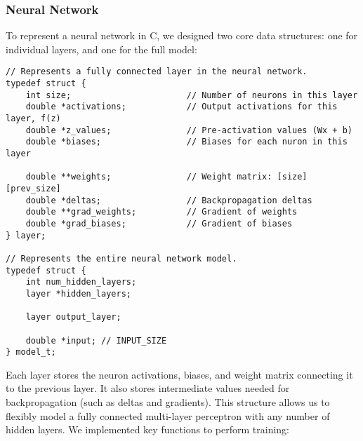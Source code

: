 \documentclass{article}
\begin{document}
\subsubsection{Neural Network}
To represent a neural network in C, we designed two core data structures: one for individual layers, and one for the full model:
\begin{lstlisting}
// Represents a fully connected layer in the neural network.
typedef struct {
    int size;                       // Number of neurons in this layer
    double *activations;            // Output activations for this layer, f(z)
    double *z_values;               // Pre-activation values (Wx + b)
    double *biases;                 // Biases for each nuron in this layer
    
    double **weights;               // Weight matrix: [size][prev_size]
    double *deltas;                 // Backpropagation deltas
    double **grad_weights;          // Gradient of weights
    double *grad_biases;            // Gradient of biases
} layer;

// Represents the entire neural network model.
typedef struct {
    int num_hidden_layers;
    layer *hidden_layers;

    layer output_layer;

    double *input; // INPUT_SIZE
} model_t;
\end{lstlisting}
Each layer stores the neuron activations, biases, and weight matrix connecting it to the previous layer. It also stores intermediate values needed for backpropagation (such as deltas and gradients). This structure allows us to flexibly model a fully connected multi-layer perceptron with any number of hidden layers.
We implemented key functions to perform training:
\end{document}
